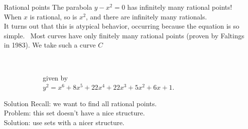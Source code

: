 \documentclass[15pt]{beamer}
\begin{document}
\begin{frame}{Rational points}
    The parabola $y-x^2 = 0$ has infinitely many rational points!\\ \pause
    When $x$ is rational, so is $x^2$, and there are infinitely many rationals.\\ \pause
    It turns out that this is atypical behavior, occurring because the equation is so simple.~\pause
    Most curves have only finitely many rational points (proven by Faltings in 1983). We take such a curve {\color{red}$C$}\\
    \vspace{-10pt}\begin{figure}
		\centering
		\begin{subfigure}[t]{0.5\textwidth}
		\begin{center}
        \end{center}
	    \end{subfigure}%
	    ~
	    \begin{subfigure}[t]{0.5\textwidth}
	    \begin{center}
        \vspace{-70pt}given by \\$y^2 = x^6 + 8x^5 + 22x^4 + 22x^3 + 5x^2 + 6x + 1$.
        \end{center}
	    \end{subfigure}%
    \end{figure}
\end{frame}

\begin{frame}{Solution}
    Recall: we want to find all rational points.\\\pause
    Problem: this set doesn't have a nice structure.\\\pause
    Solution: use sets with a nicer structure.\\
\end{frame}
\end{document}
